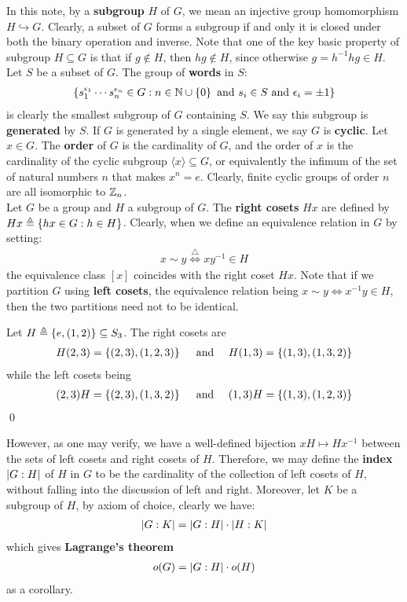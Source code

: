 \documentclass{report}
\begin{document}
In this note, by a \textbf{subgroup} $H$ of $G$, we mean an injective group homomorphism $H \hookrightarrow G $. Clearly, a subset of $G$ forms a subgroup if and only it is closed under both the binary operation and inverse. Note that one of the key basic property of subgroup $H \subseteq G$ is that if $g \not \in H$, then $hg \not \in H$, since otherwise $g=h^{-1}hg \in H$. \\


Let $S$ be a subset of $G$. The group of \textbf{words} in $S$:
\begin{align*}
\left\{ s_1^{\epsilon_1}\cdots s_n^{\epsilon _n}\in G: n\in\mathbb{N} \cup  \left\{ 0 \right\}\text{ and }s_i \in S\text{ and }\epsilon_i = \pm 1 \right\}
\end{align*}
is clearly the smallest subgroup of $G$ containing $S$. We say this subgroup is \textbf{generated} by $S$. If $G$ is generated by a single element, we say $G$ is \textbf{cyclic}. Let $x \in G$. The \textbf{order} of $G$ is the cardinality of $G$, and the order of  $x$ is the cardinality of the cyclic subgroup $\langle x\rangle \subseteq G$, or equivalently the infimum of the set of natural numbers $n$ that makes $x^n=e$. Clearly, finite cyclic groups of order $n$ are all isomorphic to  $\mathbb{Z}_n$.  \\


Let $G$ be a group and $H$ a subgroup of $G$. The \textbf{right cosets} $Hx$ are defined by $Hx\triangleq \left\{ hx \in G: h \in H \right\}$. Clearly, when we define an equivalence relation in $G$ by setting: 
\begin{align*}
x\sim  y \overset{\triangle}{\iff } xy^{-1} \in H
\end{align*}
the equivalence class $[x]$ coincides with the right coset $Hx$. Note that if we partition $G$ using \textbf{left cosets}, the equivalence relation being $x\sim  y \iff  x^{-1}y\in H$, then the two partitions need not to be identical. 
\begin{example}
Let $H\triangleq \left\{ e,(1,2) \right\}\subseteq S_3$. The right cosets are 
\begin{align*}
H(2,3)=\left\{ (2,3),(1,2,3) \right\}\quad \text{ and }\quad  H(1,3)=\left\{ (1,3),(1,3,2) \right\}
\end{align*}
while the left cosets being
\begin{align*}
(2,3)H= \left\{ (2,3),(1,3,2) \right\} \quad \text{ and }\quad (1,3)H= \left\{ (1,3),(1,2,3) \right\}
\end{align*}
\qed
\end{example}
However, as one may verify, we have a well-defined bijection $xH\mapsto Hx^{-1}$ between the sets of left cosets and right cosets of $H$. Therefore, we may define the \textbf{index} $\left|G:H\right|$ of $H$ in  $G$ to be the cardinality of the collection of left cosets of $H$, without falling into the discussion of left and right. Moreover, let $K$ be a subgroup of  $H$, by axiom of choice, clearly we have: 
\begin{align*}
\left|G:K\right|= \left|G:H\right| \cdot \left|H:K\right|
\end{align*}
which gives \textbf{Lagrange's theorem}  
\begin{align*}
o(G)= \left|G:H\right| \cdot o(H)
\end{align*}
as a corollary.\\
\end{document}
